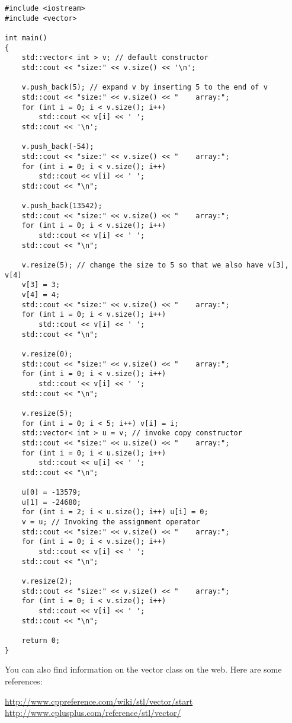\begin{Verbatim}[frame=single, commandchars=\^\@\~, fontsize=\small]
#include <iostream>
#include <vector>

int main()
{
    std::vector< int > v; // default constructor
    std::cout << "size:" << v.size() << '\n';
    
    v.push_back(5); // expand v by inserting 5 to the end of v
    std::cout << "size:" << v.size() << "    array:";
    for (int i = 0; i < v.size(); i++)
        std::cout << v[i] << ' ';
    std::cout << '\n';

    v.push_back(-54);
    std::cout << "size:" << v.size() << "    array:";
    for (int i = 0; i < v.size(); i++)
        std::cout << v[i] << ' ';
    std::cout << "\n";

    v.push_back(13542);
    std::cout << "size:" << v.size() << "    array:";
    for (int i = 0; i < v.size(); i++)
        std::cout << v[i] << ' ';
    std::cout << "\n";

    v.resize(5); // change the size to 5 so that we also have v[3], v[4]
    v[3] = 3;
    v[4] = 4;
    std::cout << "size:" << v.size() << "    array:";
    for (int i = 0; i < v.size(); i++)
        std::cout << v[i] << ' ';
    std::cout << "\n";
    
    v.resize(0);
    std::cout << "size:" << v.size() << "    array:";
    for (int i = 0; i < v.size(); i++)
        std::cout << v[i] << ' ';
    std::cout << "\n";

    v.resize(5);
    for (int i = 0; i < 5; i++) v[i] = i;
    std::vector< int > u = v; // invoke copy constructor 
    std::cout << "size:" << u.size() << "    array:";
    for (int i = 0; i < u.size(); i++)
        std::cout << u[i] << ' ';
    std::cout << "\n";

    u[0] = -13579;
    u[1] = -24680;
    for (int i = 2; i < u.size(); i++) u[i] = 0; 
    v = u; // Invoking the assignment operator
    std::cout << "size:" << v.size() << "    array:";
    for (int i = 0; i < v.size(); i++)
        std::cout << v[i] << ' ';
    std::cout << "\n";

    v.resize(2);
    std::cout << "size:" << v.size() << "    array:";
    for (int i = 0; i < v.size(); i++)
        std::cout << v[i] << ' ';
    std::cout << "\n";
    
    return 0;
}
\end{Verbatim}

\newpage

You can also find information on the vector class on the web. 
Here are some references:
\begin{tightlist}
\li \url{http://www.cppreference.com/wiki/stl/vector/start}
\li \url{http://www.cplusplus.com/reference/stl/vector/}
\end{tightlist}

